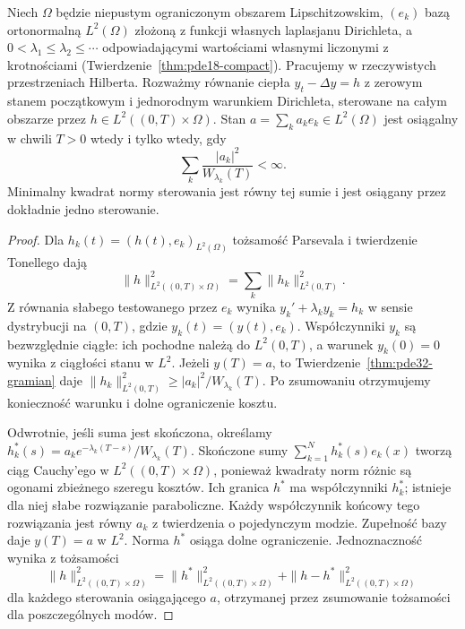\begin{twierdzenie}
\label{thm:pde32-reachable}
Niech $\Omega$ będzie niepustym ograniczonym obszarem
Lipschitzowskim, $(e_k)$ bazą ortonormalną $L^2(\Omega)$
złożoną z funkcji własnych laplasjanu Dirichleta,
a $0<\lambda_1\le\lambda_2\le\cdots$ odpowiadającymi
wartościami własnymi liczonymi z krotnościami
(Twierdzenie~\ref{thm:pde18-compact}).
Pracujemy w rzeczywistych przestrzeniach Hilberta.
Rozważmy równanie ciepła $y_t-\Delta y=h$ z zerowym
stanem początkowym i jednorodnym warunkiem Dirichleta,
sterowane na całym obszarze przez $h\in L^2((0,T)\times\Omega)$.
Stan $a=\sum_k a_ke_k\in L^2(\Omega)$ jest osiągalny
w chwili $T>0$ wtedy i tylko wtedy, gdy
\[
 \sum_k\frac{|a_k|^2}{W_{\lambda_k}(T)}<\infty .
\]
Minimalny kwadrat normy sterowania jest równy tej
sumie i jest osiągany przez dokładnie jedno sterowanie.
\end{twierdzenie}
\begin{proof}
Dla $h_k(t)=(h(t),e_k)_{L^2(\Omega)}$ tożsamość
Parsevala i twierdzenie Tonellego dają
\[
 \|h\|_{L^2((0,T)\times\Omega)}^2
 =\sum_k\|h_k\|_{L^2(0,T)}^2.
\]
Z równania słabego testowanego przez $e_k$
wynika $y_k'+\lambda_k y_k=h_k$ w sensie
dystrybucji na $(0,T)$, gdzie $y_k(t)=(y(t),e_k)$.
Współczynniki $y_k$ są bezwzględnie ciągłe:
ich pochodne należą do $L^2(0,T)$, a warunek
$y_k(0)=0$ wynika z ciągłości stanu w $L^2$.
Jeżeli $y(T)=a$, to Twierdzenie~\ref{thm:pde32-gramian}
daje $\|h_k\|_{L^2(0,T)}^2\ge |a_k|^2/W_{\lambda_k}(T)$.
Po zsumowaniu otrzymujemy konieczność warunku
i dolne ograniczenie kosztu.

Odwrotnie, jeśli suma jest skończona, określamy
$h_k^*(s)=a_ke^{-\lambda_k(T-s)}/W_{\lambda_k}(T)$.
Skończone sumy $\sum_{k=1}^N h_k^*(s)e_k(x)$
tworzą ciąg Cauchy'ego w $L^2((0,T)\times\Omega)$,
ponieważ kwadraty norm różnic są ogonami
zbieżnego szeregu kosztów. Ich granica $h^*$
ma współczynniki $h_k^*$; istnieje dla niej
słabe rozwiązanie paraboliczne.
Każdy współczynnik końcowy tego rozwiązania
jest równy $a_k$ z twierdzenia o pojedynczym
modzie. Zupełność bazy daje $y(T)=a$ w $L^2$.
Norma $h^*$ osiąga dolne ograniczenie.
Jednoznaczność wynika z tożsamości
\[
 \|h\|_{L^2((0,T)\times\Omega)}^2
 =\|h^*\|_{L^2((0,T)\times\Omega)}^2+
 \|h-h^*\|_{L^2((0,T)\times\Omega)}^2
\]
dla każdego sterowania osiągającego $a$,
otrzymanej przez zsumowanie tożsamości
dla poszczególnych modów.
\end{proof}
